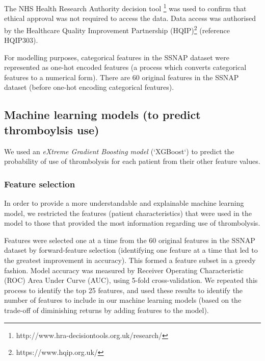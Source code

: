 The NHS Health Research Authority decision tool \footnote{http://www.hra-decisiontools.org.uk/research/} was used to confirm that ethical approval was not required to access the data. Data access was authorised by the Healthcare Quality Improvement Partnership (HQIP)\footnote{https://www.hqip.org.uk/} (reference HQIP303). 

For modelling purposes, categorical features in the SSNAP dataset were represented as one-hot encoded features (a process which converts categorical features to a numerical form). There are 60 original features in the SSNAP dataset (before one-hot encoding categorical features).

\subsection{Machine learning models (to predict thromboylsis use)}
We used an \emph{eXtreme Gradient Boosting model \cite{chen_xgboost_2016}} (`XGBoost`) to predict the probability of use of thrombolysis for each patient from their other feature values.

\subsubsection{Feature selection}
In order to provide a more understandable and explainable machine learning model, we restricted the features (patient characteristics) that were used in the model to those that provided the most information regarding use of thrombolysis. 

Features were selected one at a time from the 60 original features in the SSNAP dataset by forward-feature selection (identifying one feature at a time that led to the greatest improvement in accuracy). This formed a feature subset in a greedy fashion. Model accuracy was measured by Receiver Operating Characteristic (ROC) Area Under Curve (AUC), using 5-fold cross-validation. We repeated this process to identify the top 25 features, and used these results to identify the number of features to include in our machine learning models (based on the trade-off of diminishing returns by adding features to the model).


